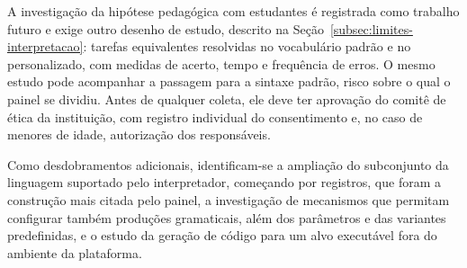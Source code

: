 A investigação da hipótese pedagógica com estudantes é registrada como trabalho futuro e exige outro desenho de estudo, descrito na Seção~\ref{subsec:limites-interpretacao}: tarefas equivalentes resolvidas no vocabulário padrão e no personalizado, com medidas de acerto, tempo e frequência de erros. O mesmo estudo pode acompanhar a passagem para a sintaxe padrão, risco sobre o qual o painel se dividiu. Antes de qualquer coleta, ele deve ter aprovação do comitê de ética da instituição, com registro individual do consentimento e, no caso de menores de idade, autorização dos responsáveis.

Como desdobramentos adicionais, identificam-se a ampliação do subconjunto da linguagem suportado pelo interpretador, começando por registros, que foram a construção mais citada pelo painel, a investigação de mecanismos que permitam configurar também produções gramaticais, além dos parâmetros e das variantes predefinidas, e o estudo da geração de código para um alvo executável fora do ambiente da plataforma.
